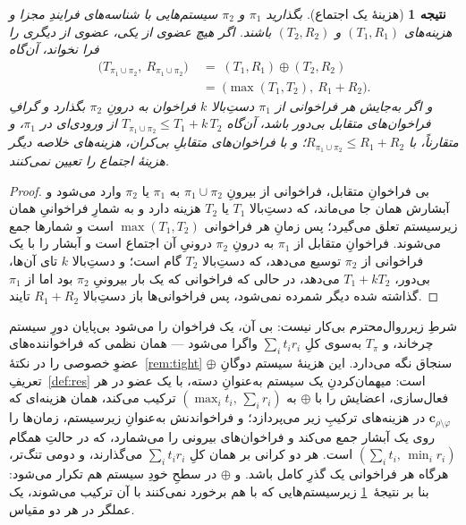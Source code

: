 \documentclass[10pt,oneside,openany]{book}
\newcommand{\bd}[1]{\mathbf{#1}}
\theoremstyle{accentdef}
\theoremstyle{accentplain}
\newtheorem{corollary}[definition]{نتیجه}
\begin{document}
\begin{corollary}[هزینهٔ یک اجتماع]\label{cor:syscost}
بگذارید $\pi_1$ و $\pi_2$ سیستم‌هایی با شناسه‌های فرایندِ مجزا و هزینه‌های
$(T_1,R_1)$ و $(T_2,R_2)$ باشند. اگر هیچ عضوی از یکی، عضوی از دیگری را فرا
نخواند، آن‌گاه
\[
  \begin{aligned}
  \bigl(T_{\pi_1 \cup \pi_2},\ R_{\pi_1 \cup \pi_2}\bigr) &\;=\; (T_1,R_1) \oplus (T_2,R_2) \\
  &\;=\; \bigl(\max(T_1,T_2),\ R_1 + R_2\bigr) .
  \end{aligned}
\]
و اگر به‌جایش هر فراخوانی از $\pi_1$ دستِ‌بالا $k$ فراخوان به درونِ $\pi_2$
بگذارد و گرافِ فراخوان‌های متقابل بی‌دور باشد، آن‌گاه $T_{\pi_1 \cup \pi_2}
\le T_1 + k\,T_2$ از ورودی‌ای در $\pi_1$، و متقارناً، با $R_{\pi_1 \cup
\pi_2} \le R_1 + R_2$؛ و با فراخوان‌های متقابلِ بی‌کران، هزینه‌های خلاصه
دیگر هزینهٔ اجتماع را تعیین نمی‌کنند.
\end{corollary}

\begin{proof}
بی فراخوانِ متقابل، فراخوانی از بیرونِ $\pi_1 \cup \pi_2$ به $\pi_1$ یا
$\pi_2$ وارد می‌شود و آبشارش همان جا می‌ماند، که دستِ‌بالا $T_1$ یا $T_2$
هزینه دارد و به شمارِ فراخوانیِ همان زیرسیستم تعلق می‌گیرد؛ پس زمانِ هر
فراخوانی $\max(T_1,T_2)$ است و شمارها جمع می‌شوند. فراخوانِ متقابل از
$\pi_1$ به درونِ $\pi_2$ درونیِ آن اجتماع است و آبشار را با یک فراخوانی از
$\pi_2$ توسیع می‌دهد، که دستِ‌بالا $T_2$ گام است؛ و دستِ‌بالا $k$ تای
آن‌ها، بی‌دور، $T_1 + k T_2$ می‌دهد، در حالی که فراخوانی که یک بار بیرونیِ
$\pi_2$ بود اما از $\pi_1$ گذاشته شده دیگر شمرده نمی‌شود، پس فراخوانی‌ها باز
دستِ‌بالا $R_1 + R_2$ تایند.
\end{proof}

شرطِ زیرروال‌محترم بی‌کار نیست: بی آن، یک فراخوان را می‌شود بی‌پایان دورِ
سیستم چرخاند، و $T_\pi$ به‌سوی کلِ $\sum_i t_i r_i$ واگرا می‌شود --- همان
نظمی که فراخواننده‌های عضوِ خصوصی را در نکتهٔ~\ref{rem:tight} سنجاق نگه
می‌دارد. این هزینهٔ سیستم دوگانِ $\oplus$ِ تعریفِ~\ref{def:res} است:
میهمان‌کردنِ یک سیستم به‌عنوانِ دسته، با یک عضو در هر فعال‌سازی، اعضایش را با
$\oplus$ به $(\max_i t_i,\, \sum_i r_i)$ ترکیب می‌کند، همان هزینه‌ای که
$\bd{c}_{\rho \setminus \varphi}$ در هزینه‌های ترکیبِ زیر می‌پردازد؛ و
فراخواندنش به‌عنوانِ زیرسیستم، زمان‌ها را روی یک آبشار جمع می‌کند و
فراخوان‌های بیرونی را می‌شمارد، که در حالتِ همگام $(\sum_i t_i,\, \min_i
r_i)$ است. هر دو کرانی بر همان کلِ $\sum_i t_i r_i$ می‌گذارند، و دومی
تنگ‌تر، هرگاه هر فراخوانی یک گذرِ کامل باشد. و $\oplus$ در سطحِ خودِ سیستم هم
تکرار می‌شود: بنا بر نتیجهٔ~\ref{cor:syscost} زیرسیستم‌هایی که با هم
برخورد نمی‌کنند با آن ترکیب می‌شوند، یک عملگر در هر دو مقیاس.
\end{document}
